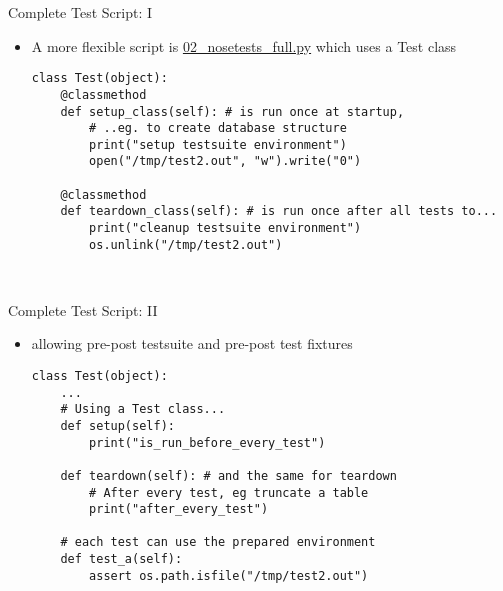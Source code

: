 \begin{pyframe}{Complete Test Script: I}
\begin{itemize}
\item A more flexible script is \href{https://github.com/ioggstream/python-course/blob/master/python-for-sysadmin/02_nosetests_full.py}{02\_nosetests\_full.py}
which uses a Test class
\begin{verbatim}
class Test(object):
    @classmethod
    def setup_class(self): # is run once at startup, 
        # ..eg. to create database structure
        print("setup testsuite environment")
        open("/tmp/test2.out", "w").write("0")

    @classmethod
    def teardown_class(self): # is run once after all tests to...
        print("cleanup testsuite environment")
        os.unlink("/tmp/test2.out")

 
\end{verbatim} 
\end{itemize}
\end{pyframe}

\begin{pyframe}{Complete Test Script: II}
\begin{itemize}
\item allowing pre-post testsuite and pre-post test fixtures
\begin{verbatim}
class Test(object):
    ...
    # Using a Test class...
    def setup(self): 
        print("is_run_before_every_test")

    def teardown(self): # and the same for teardown
        # After every test, eg truncate a table
        print("after_every_test")

    # each test can use the prepared environment
    def test_a(self): 
        assert os.path.isfile("/tmp/test2.out")
 
\end{verbatim}
\end{itemize}
\end{pyframe}
